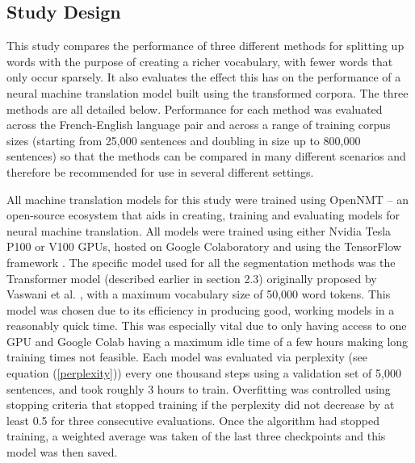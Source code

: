 \documentclass[11pt]{article}
\begin{document}
\subsection{Study Design}

This study compares the performance of three different methods for splitting up words with the purpose of creating a richer vocabulary, with fewer words that only occur sparsely. It also evaluates the effect this has on the performance of a neural machine translation model built using the transformed corpora.  The three methods are all detailed below. Performance for each method was evaluated across the French-English language pair and across a range of training corpus sizes (starting from 25,000 sentences and doubling in size up to 800,000 sentences) so that the methods can be compared in many different scenarios and therefore be recommended for use in several different settings.

\bigskip

All machine translation models for this study were trained using OpenNMT \citep{klein-etal-2017-opennmt} -- an open-source ecosystem that aids in creating, training and evaluating models for neural machine translation. All models were trained using either Nvidia Tesla P100 or V100 GPUs, hosted on Google Colaboratory and using the TensorFlow framework \citep{tensorflow2015-whitepaper}. The specific model used for all the segmentation methods was the Transformer model (described earlier in section 2.3) originally proposed by Vaswani et al. \citeyearpar{vaswani2017attention}, with a maximum vocabulary size of 50,000 word tokens. %
This model was chosen due to its efficiency in producing good, working models in a reasonably quick time. This was especially vital due to only having access to one GPU and Google Colab having a maximum idle time of a few hours making long training times not feasible. Each model was evaluated via perplexity (see equation (\ref{perplexity})) every one thousand steps using a validation set of 5,000 sentences, and took roughly 3 hours to train.  Overfitting was controlled using stopping criteria that stopped training if the perplexity did not decrease by at least 0.5 for three consecutive evaluations. Once the algorithm had stopped training, a weighted average was taken of the last three checkpoints and this model was then saved.

\bigskip
\end{document}
